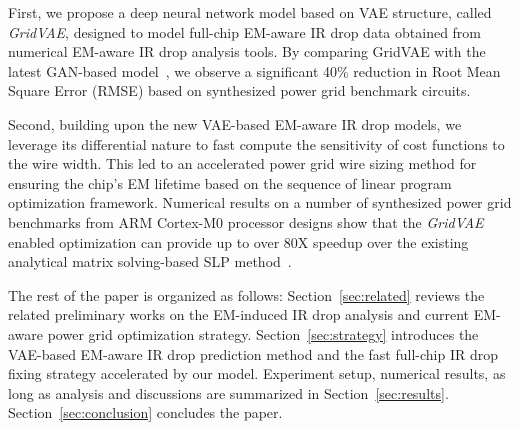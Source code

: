 \begin{itemlist}

\item  First, we propose a deep neural network model based on VAE structure, called {\it GridVAE}, designed to model full-chip EM-aware IR drop data obtained from numerical EM-aware IR drop analysis tools. By comparing GridVAE with the latest GAN-based model~\cite{ZhouJin:ICCAD'20}, we observe a significant 40\% reduction in Root Mean Square Error (RMSE) based on synthesized power grid benchmark circuits.

\item Second, building upon the new VAE-based EM-aware IR drop models, we leverage its differential nature to fast compute the sensitivity of cost functions to the wire width. This led to an accelerated power grid wire sizing method for ensuring the chip's EM lifetime based on the sequence of linear program optimization framework. Numerical results on a number of synthesized power grid benchmarks from ARM Cortex-M0 processor designs show that the {\it GridVAE} enabled optimization can provide up to over $80$X speedup over the existing analytical matrix solving-based SLP method~\cite{Sukharev:2019pg}.
 
\end{itemlist}

The rest of the paper is organized as follows: Section~\ref{sec:related} reviews the related preliminary works on the EM-induced IR drop analysis and current EM-aware power grid optimization strategy. Section~\ref{sec:strategy} introduces the VAE-based EM-aware IR drop prediction method and the fast full-chip IR drop fixing strategy accelerated by our model. Experiment setup, numerical results, as long as analysis and discussions are summarized in Section~\ref{sec:results}.  Section~\ref{sec:conclusion} concludes the paper.